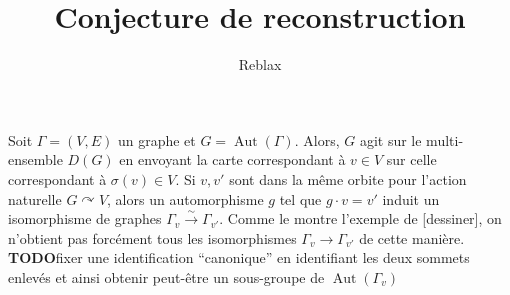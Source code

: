 \documentclass{article}
\title{Conjecture de reconstruction}
\author{Reblax}
\date{}
\DeclareMathOperator{\Aut}{Aut}
\newcommand{\todo}{\textbf{TODO}}
\theoremstyle{plain}
\theoremstyle{definition}
\theoremstyle{remark}
\begin{document}
\maketitle

Soit $\Gamma = (V,E)$ un graphe et $G = \Aut(\Gamma)$. Alors, $G$ agit sur le multi-ensemble $D(G)$ en envoyant la carte correspondant à $v \in V$ sur celle correspondant à $\sigma(v) \in V$. Si $v,v'$ sont dans la même orbite pour l'action naturelle $G \curvearrowright V$, alors un automorphisme $g$ tel que $g\cdot v = v'$ induit un isomorphisme de graphes $\Gamma_v \xrightarrow{\sim} \Gamma_{v'}$. Comme le montre l'exemple de [dessiner], on n'obtient pas forcément tous les isomorphismes $\Gamma_v \to \Gamma_{v'}$ de cette manière. \todo fixer une identification ``canonique'' en identifiant les deux sommets enlevés et ainsi obtenir peut-être un sous-groupe de $\Aut(\Gamma_v)$
\end{document}
